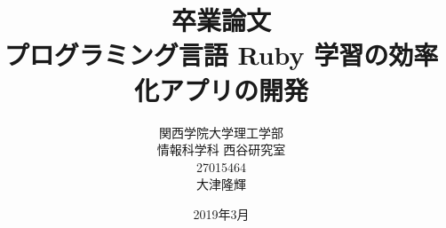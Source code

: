 \title{卒業論文\\プログラミング言語 Ruby 学習の効率化アプリの開発}
\author{関西学院大学理工学部\\情報科学科 西谷研究室\\27015464\\大津隆輝 }
\date{2019年3月}

\maketitle
\newpage
